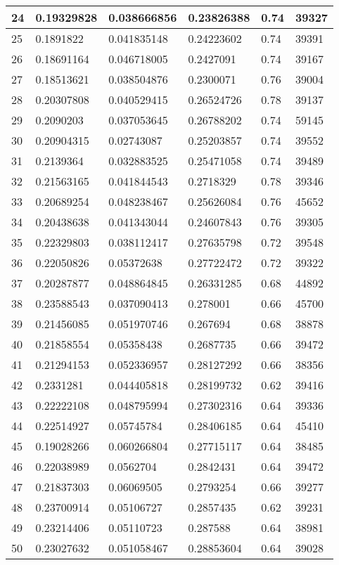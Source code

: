 \begin{longtable}{|l|l|l|l|l|l|}
24 & 0.19329828 & 0.038666856 & 0.23826388 & 0.74 & 39327 \\ \hline 
25 & 0.1891822 & 0.041835148 & 0.24223602 & 0.74 & 39391 \\ \hline 
26 & 0.18691164 & 0.046718005 & 0.2427091 & 0.74 & 39167 \\ \hline 
27 & 0.18513621 & 0.038504876 & 0.2300071 & 0.76 & 39004 \\ \hline 
28 & 0.20307808 & 0.040529415 & 0.26524726 & 0.78 & 39137 \\ \hline 
29 & 0.2090203 & 0.037053645 & 0.26788202 & 0.74 & 59145 \\ \hline 
30 & 0.20904315 & 0.02743087 & 0.25203857 & 0.74 & 39552 \\ \hline 
31 & 0.2139364 & 0.032883525 & 0.25471058 & 0.74 & 39489 \\ \hline 
32 & 0.21563165 & 0.041844543 & 0.2718329 & 0.78 & 39346 \\ \hline 
33 & 0.20689254 & 0.048238467 & 0.25626084 & 0.76 & 45652 \\ \hline 
34 & 0.20438638 & 0.041343044 & 0.24607843 & 0.76 & 39305 \\ \hline 
35 & 0.22329803 & 0.038112417 & 0.27635798 & 0.72 & 39548 \\ \hline 
36 & 0.22050826 & 0.05372638 & 0.27722472 & 0.72 & 39322 \\ \hline 
37 & 0.20287877 & 0.048864845 & 0.26331285 & 0.68 & 44892 \\ \hline 
38 & 0.23588543 & 0.037090413 & 0.278001 & 0.66 & 45700 \\ \hline 
39 & 0.21456085 & 0.051970746 & 0.267694 & 0.68 & 38878 \\ \hline 
40 & 0.21858554 & 0.05358438 & 0.2687735 & 0.66 & 39472 \\ \hline 
41 & 0.21294153 & 0.052336957 & 0.28127292 & 0.66 & 38356 \\ \hline 
42 & 0.2331281 & 0.044405818 & 0.28199732 & 0.62 & 39416 \\ \hline 
43 & 0.22222108 & 0.048795994 & 0.27302316 & 0.64 & 39336 \\ \hline 
44 & 0.22514927 & 0.05745784 & 0.28406185 & 0.64 & 45410 \\ \hline 
45 & 0.19028266 & 0.060266804 & 0.27715117 & 0.64 & 38485 \\ \hline 
46 & 0.22038989 & 0.0562704 & 0.2842431 & 0.64 & 39472 \\ \hline 
47 & 0.21837303 & 0.06069505 & 0.2793254 & 0.66 & 39277 \\ \hline 
48 & 0.23700914 & 0.05106727 & 0.2857435 & 0.62 & 39231 \\ \hline 
49 & 0.23214406 & 0.05110723 & 0.287588 & 0.64 & 38981 \\ \hline 
50 & 0.23027632 & 0.051058467 & 0.28853604 & 0.64 & 39028 \\ \hline 
\end{longtable}